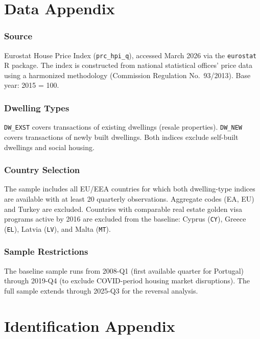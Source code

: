 \documentclass[12pt]{article}
\begin{document}
\label{apep_main_text_end}
\newpage


\newpage
\appendix

\section{Data Appendix}

\subsubsection*{Source} Eurostat House Price Index (\texttt{prc\_hpi\_q}), accessed March 2026 via the \texttt{eurostat} R package. The index is constructed from national statistical offices' price data using a harmonized methodology (Commission Regulation No.~93/2013). Base year: 2015 = 100.

\subsubsection*{Dwelling Types} \texttt{DW\_EXST} covers transactions of existing dwellings (resale properties). \texttt{DW\_NEW} covers transactions of newly built dwellings. Both indices exclude self-built dwellings and social housing.

\subsubsection*{Country Selection} The sample includes all EU/EEA countries for which both dwelling-type indices are available with at least 20 quarterly observations. Aggregate codes (EA, EU) and Turkey are excluded. Countries with comparable real estate golden visa programs active by 2016 are excluded from the baseline: Cyprus (\texttt{CY}), Greece (\texttt{EL}), Latvia (\texttt{LV}), and Malta (\texttt{MT}).

\subsubsection*{Sample Restrictions} The baseline sample runs from 2008-Q1 (first available quarter for Portugal) through 2019-Q4 (to exclude COVID-period housing market disruptions). The full sample extends through 2025-Q3 for the reversal analysis.

\section{Identification Appendix}
\end{document}
